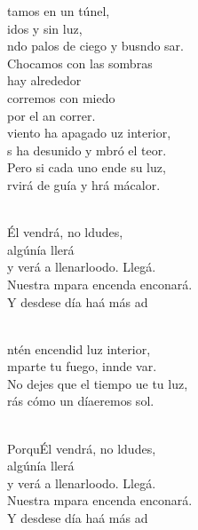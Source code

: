 \documentclass[12pt]{article}
\begin{document}
\begin{multicols*}{2}
\begin{cancion}%
	tamos en un túnel, \\
	idos y sin luz,\\
	ndo palos de ciego y busndo sar.\\
Chocamos con las sombras \\
	hay alrededor\\
	corremos con miedo \\
	por el an correr.\\
\jump
	 viento ha apagado uz interior,\\
	s ha desunido y mbró el teor.\\
	Pero si cada uno ende su luz,\\
	rvirá de guía y hrá mácalor.\\\jump\\
	\begin{chorus}%
	Él vendrá, no ldudes, \\
	algúnía llerá\\
	y verá a llenarloodo. Llegá. \\
	Nuestra mpara encenda enconará. \\
	Y desdese día haá más ad\\
	\end{chorus}%
	\jump\\
	ntén encendid luz interior,\\
	mparte tu fuego, innde var.\\
	No dejes que el tiempo ue tu luz,\\
	rás cómo un díaeremos  sol.\\\jump\\
	\begin{chorus}%
	PorquÉl vendrá, no ldudes, \\
	algúnía llerá\\
	y verá a llenarloodo. Llegá. \\
	Nuestra mpara encenda enconará. \\
	Y desdese día haá más ad\\
	\end{chorus}%
	\jump\\
\end{cancion}%


\end{multicols*}
\end{document}
